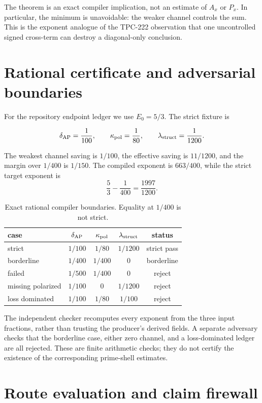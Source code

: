 \documentclass[11pt]{article}
\begin{document}
The theorem is an exact compiler implication, not an estimate of $A_x$ or
$P_x$.  In particular, the minimum is unavoidable: the weaker channel controls
the sum.  This is the exponent analogue of the TPC-222 observation that one
uncontrolled signed cross-term can destroy a diagonal-only conclusion.

\section{Rational certificate and adversarial boundaries}

For the repository endpoint ledger we use $E_0=5/3$.  The strict fixture is

\[
 \delta_{\rm AP}=\frac1{100},\qquad
 \kappa_{\rm pol}=\frac1{80},\qquad
 \lambda_{\rm struct}=\frac1{1200}.
\]

The weakest channel saving is $1/100$, the effective saving is
$11/1200$, and the margin over $1/400$ is $1/150$.  The compiled exponent is
$663/400$, while the strict target exponent is
\[
 \frac53-\frac1{400}=\frac{1997}{1200}.
\]

\begin{table}[t]
\centering
\begin{tabular}{lcccc}
\toprule
case & $\delta_{\rm AP}$ & $\kappa_{\rm pol}$ & $\lambda_{\rm struct}$ & status\\
\midrule
strict & $1/100$ & $1/80$ & $1/1200$ & strict pass\\
borderline & $1/400$ & $1/400$ & $0$ & borderline\\
failed & $1/500$ & $1/400$ & $0$ & reject\\
missing polarized & $1/100$ & $0$ & $1/1200$ & reject\\
loss dominated & $1/100$ & $1/80$ & $1/100$ & reject\\
\bottomrule
\end{tabular}
\caption{Exact rational compiler boundaries. Equality at $1/400$ is not strict.}
\label{tab:certificate}
\end{table}

The independent checker recomputes every exponent from the three input fractions,
rather than trusting the producer's derived fields.  A separate adversary checks
that the borderline case, either zero channel, and a loss-dominated ledger are
all rejected.  These are finite arithmetic checks; they do not certify the
existence of the corresponding prime-shell estimates.

\section{Route evaluation and claim firewall}
\end{document}
